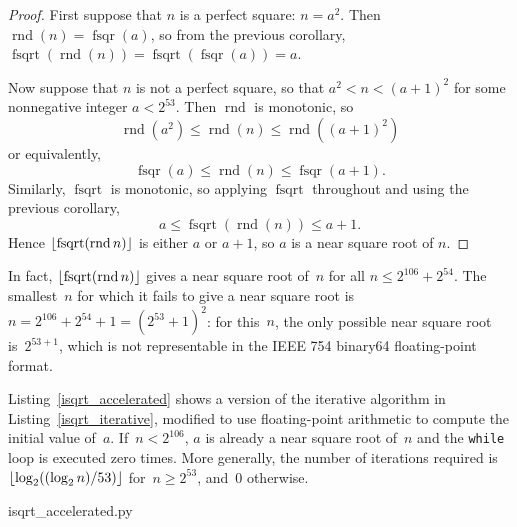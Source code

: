 \documentclass[a4paper]{article}
\DeclarePairedDelimiter\floor{\lfloor}{\rfloor}
\DeclareMathOperator{\rnd}{rnd}
\DeclareMathOperator{\fsqrt}{fsqrt}
\DeclareMathOperator{\fsqr}{fsqr}
\theoremstyle{plain}
\theoremstyle{definition}
\begin{document}
\begin{proof}
  First suppose that $n$ is a perfect square: $n = a^2$. Then $\rnd(n) =
  \fsqr(a)$, so from the previous corollary, $\fsqrt(\rnd(n)) =
  \fsqrt(\fsqr(a)) = a$.

  Now suppose that $n$ is not a perfect square, so that $a^2 < n < (a+1)^2$
  for some nonnegative integer $a < 2^{53}$. Then $\rnd$ is monotonic, so
    $$\rnd(a^2) \le \rnd(n) \le \rnd((a+1)^2)$$
  or equivalently,
    $$\fsqr(a) \le \rnd(n) \le \fsqr(a+1).$$
  Similarly, $\fsqrt$ is monotonic, so applying $\fsqrt$ throughout
  and using the previous corollary,
    $$a \le \fsqrt(\rnd(n)) \le a + 1.$$
  Hence $\floor{\fsqrt(\rnd n)}$ is either $a$ or $a+1$, so $a$ is a near
  square root of $n$.
\end{proof}

In fact, $\floor{\fsqrt(\rnd n)}$ gives a near square root of~$n$ for all $n
\le 2^{106} + 2^{54}$. The smallest~$n$ for which it fails to give a near
square root is $n = 2^{106} + 2^{54} + 1 = (2^{53} + 1)^2$: for this~$n$,
the only possible near square root is~$2^{53 + 1}$, which is not representable
in the IEEE 754 binary64 floating-point format.

Listing~\ref{isqrt_accelerated} shows a version of the iterative
algorithm in Listing~\ref{isqrt_iterative}, modified to use floating-point
arithmetic to compute the initial value of~$a$.  If~$n < 2^{106}$,
$a$ is already a near square root of~$n$ and the \lstinline$while$ loop is
executed zero times. More generally, the number of iterations required
is~$\floor{\log_2((\log_2n)/53)}$ for~$n \ge 2^{53}$, and~$0$ otherwise.


  {isqrt_accelerated.py}




\end{document}
